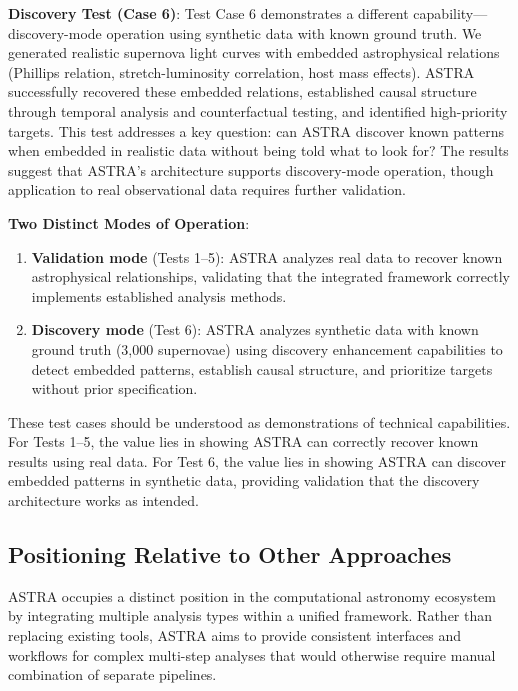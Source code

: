 \documentclass[usenatbib]{rasti}
\begin{document}
\textbf{Discovery Test (Case 6)}: Test Case 6 demonstrates a different capability---discovery-mode operation using synthetic data with known ground truth. We generated realistic supernova light curves with embedded astrophysical relations (Phillips relation, stretch-luminosity correlation, host mass effects). ASTRA successfully recovered these embedded relations, established causal structure through temporal analysis and counterfactual testing, and identified high-priority targets. This test addresses a key question: can ASTRA discover known patterns when embedded in realistic data without being told what to look for? The results suggest that ASTRA's architecture supports discovery-mode operation, though application to real observational data requires further validation.

\textbf{Two Distinct Modes of Operation}:
\begin{enumerate}
\item \textbf{Validation mode} (Tests 1--5): ASTRA analyzes real data to recover known astrophysical relationships, validating that the integrated framework correctly implements established analysis methods.
\item \textbf{Discovery mode} (Test 6): ASTRA analyzes synthetic data with known ground truth (3,000 supernovae) using discovery enhancement capabilities to detect embedded patterns, establish causal structure, and prioritize targets without prior specification.
\end{enumerate}

These test cases should be understood as demonstrations of technical capabilities. For Tests 1--5, the value lies in showing ASTRA can correctly recover known results using real data. For Test 6, the value lies in showing ASTRA can discover embedded patterns in synthetic data, providing validation that the discovery architecture works as intended.

\subsection{Positioning Relative to Other Approaches}

ASTRA occupies a distinct position in the computational astronomy ecosystem by integrating multiple analysis types within a unified framework. Rather than replacing existing tools, ASTRA aims to provide consistent interfaces and workflows for complex multi-step analyses that would otherwise require manual combination of separate pipelines.
\end{document}
